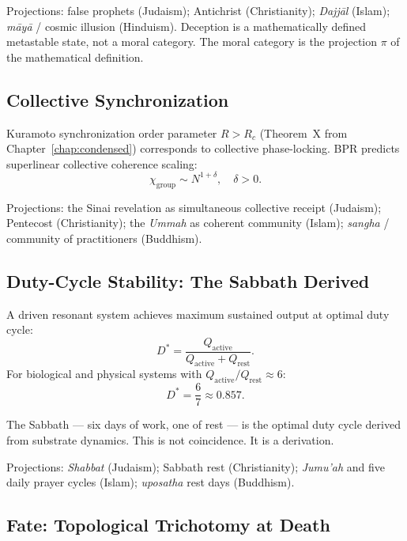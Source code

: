 \documentclass[12pt,oneside]{book}
\theoremstyle{definition}
\begin{document}
\noindent Projections: false prophets (Judaism); Antichrist (Christianity);
\textit{Dajj\={a}l} (Islam); \textit{m\={a}y\={a}} / cosmic illusion (Hinduism).
Deception is a mathematically defined metastable state, not a moral category.
The moral category is the projection $\pi$ of the mathematical definition.

\subsection{Collective Synchronization}

Kuramoto synchronization order parameter $R > R_c$ (Theorem~X from
Chapter~\ref{chap:condensed}) corresponds to collective phase-locking.
BPR predicts superlinear collective coherence scaling:
\begin{equation}
  \chi_{\mathrm{group}} \sim N^{1+\delta}, \quad \delta > 0.
\end{equation}

\noindent Projections: the Sinai revelation as simultaneous collective receipt
(Judaism); Pentecost (Christianity); the \textit{Ummah} as coherent community (Islam);
\textit{sangha} / community of practitioners (Buddhism).

\subsection{Duty-Cycle Stability: The Sabbath Derived}

A driven resonant system achieves maximum sustained output at optimal duty cycle:
\begin{equation}
  D^* = \frac{Q_{\mathrm{active}}}{Q_{\mathrm{active}} + Q_{\mathrm{rest}}}.
\end{equation}
For biological and physical systems with $Q_{\mathrm{active}}/Q_{\mathrm{rest}} \approx 6$:
\begin{equation}
  D^* = \frac{6}{7} \approx 0.857.
\end{equation}

The Sabbath --- six days of work, one of rest --- is the optimal duty cycle derived
from substrate dynamics. This is not coincidence. It is a derivation.

\noindent Projections: \textit{Shabbat} (Judaism); Sabbath rest (Christianity);
\textit{Jumu'ah} and five daily prayer cycles (Islam); \textit{uposatha} rest days (Buddhism).

\subsection{Fate: Topological Trichotomy at Death}
\end{document}
